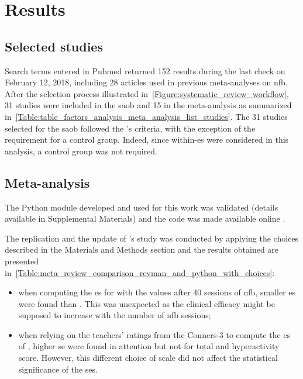 


\section{Results}

\subsection{Selected studies}

Search terms entered in Pubmed returned 152 results during the last check on February 12, 2018, including 28 
articles used in previous meta-analyses on \gls{nfb}. After the selection process illustrated 
in~\cref{Figure:systematic_review_workflow}, 31 studies were included in the \gls{saob} and 15 in the meta-analysis 
as summarized in~\cref{Table:table_factors_analysis_meta_analysis_list_studies}. The 31 studies selected for the \gls{saob} 
followed the \citeauthor{Cortese2016}'s criteria, with the exception of the requirement for a control group. 
Indeed, since within-\gls{es} were considered in this analysis, a control group was not required.

\subsection{Meta-analysis}

The Python module developed and used for this work was validated (details available in Supplemental Materials) 
and the code was made available online \citep{Bussalb2018}.

The replication and the update of \citeauthor{Cortese2016}'s study was conducted by applying the choices described 
in the Materials and Methods section and the results obtained are presented 
in~\cref{Table:meta_review_comparison_revman_and_python_with_choices}:

\begin{itemize}
    \item when computing the \gls{es} for \citet{Arnold2014} with the values after 40 sessions of \gls{nfb}, 
      smaller \gls{es} were found than \citet{Cortese2016}. This was unexpected as  
			the clinical efficacy might be supposed to increase with the number of \gls{nfb} sessions;  
    \item when relying on the teachers' ratings from the Conners-3 to compute the \gls{es} of \citet{Steiner2014}, 
		higher \gls{se} were found in attention but not for total and hyperactivity score. However, this different choice of 
		scale did not affect the statistical significance of the \glspl{se}.
\end{itemize}

